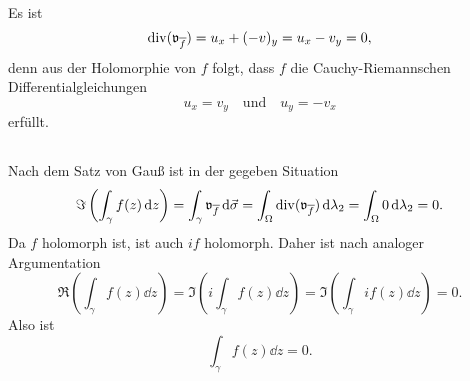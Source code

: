 \documentclass[a4paper,10pt]{article}
\begin{document}
\subsection{}
Es ist
\[
 \operatorname{div}( \mathfrak{v}_{\overline{f}} )
 = u_x + (-v)_y
 = u_x - v_y
 = 0,
\]
denn aus der Holomorphie von $f$ folgt, dass $f$ die Cauchy-Riemannschen Differentialgleichungen
\[
 u_x = v_y \quad \text{und} \quad u_y = -v_x
\]
erfüllt.


\subsection{}
Nach dem Satz von Gauß ist in der gegeben Situation
\[
 \Im\left( \int_\gamma f(z) \,\text{d}z \right)
 = \int_\gamma \mathfrak{v}_{\overline{f}} \,\text{d}\vec{\sigma}
 = \int_\Omega \operatorname{div}(\mathfrak{v}_{\overline{f}}) \,\text{d}\lambda_2
 = \int_\Omega 0 \,\text{d}\lambda_2
 = 0.
\]
Da $f$ holomorph ist, ist auch $if$ holomorph. Daher ist nach analoger Argumentation
\[
 \Re\left( \int_\gamma f(z) \dd{z} \right)
 = \Im\left( i \int_\gamma f(z) \dd{z} \right)
 = \Im\left( \int_\gamma if(z) \dd{z} \right)
 = 0.
\]
Also ist
\[
 \int_\gamma f(z) \dd{z} = 0.
\]
\end{document}
